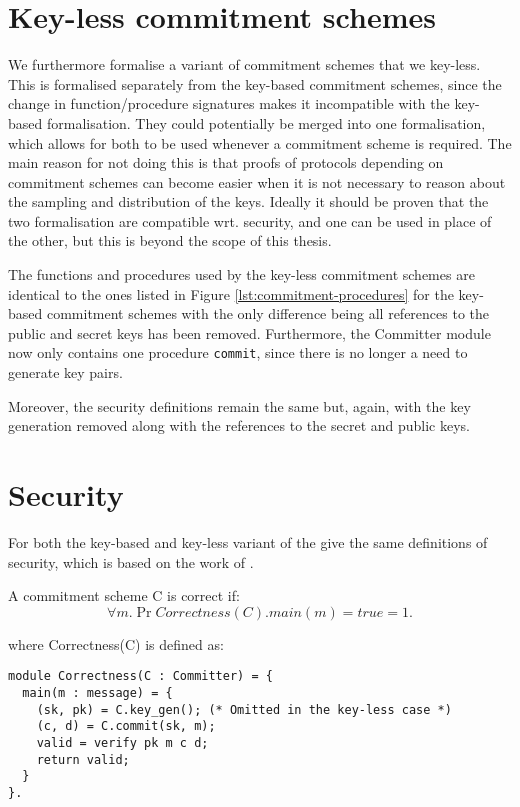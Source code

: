 \section{Key-less commitment schemes}
\label{sec:commitment:key-less}
We furthermore formalise a variant of commitment schemes that we key-less. This
is formalised separately from the key-based commitment schemes, since the
change in function/procedure signatures makes it incompatible with the key-based
formalisation. They could potentially be merged into one formalisation, which
allows for both to be used whenever a commitment scheme is required. The main
reason for not doing this is that proofs of protocols depending on commitment
schemes can become easier when it is not necessary to reason about the sampling
and distribution of the keys. Ideally it should be
proven that the two formalisation are compatible wrt. security, and one can be
used in place of the other, but this is beyond the scope of this thesis.

The functions and procedures used by the key-less commitment schemes are
identical to the ones listed in Figure \ref{lst:commitment-procedures} for the
key-based commitment schemes with the only difference being all references to
the public and secret keys has been removed. Furthermore, the Committer module
now only contains one procedure \texttt{commit}, since there is no longer a need
to generate key pairs.

Moreover, the security definitions remain the same but, again, with the key
generation removed along with the references to the secret and public keys.

\section{Security}
\label{sec:commitment:sec}
For both the key-based and key-less variant of the give the same definitions of security, which is based on the work of \citet{DBLP:journals/corr/MetereD17}.

\begin{definition}[Correctness]
  \label{def:commitment:correctness}
  A commitment scheme C is correct if:
  \[
    \forall m. \Pr{ Correctness(C).main(m) = true } = 1.
  \]

  where Correctness(C) is defined as:

\begin{lstlisting}
module Correctness(C : Committer) = {
  main(m : message) = {
    (sk, pk) = C.key_gen(); (* Omitted in the key-less case *)
    (c, d) = C.commit(sk, m);
    valid = verify pk m c d;
    return valid;
  }
}.
\end{lstlisting}


\end{definition}

